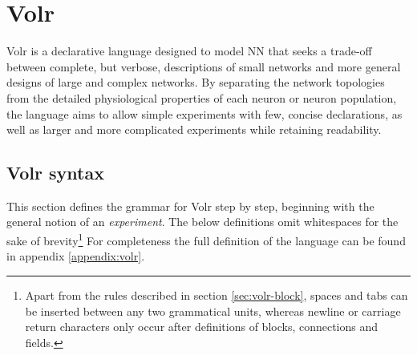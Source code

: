 \section{Volr}
Volr is a declarative language designed to model \gls{NN} that seeks a
trade-off between complete, but verbose, descriptions of small
networks and more general designs of large and complex networks.
By separating the network topologies from the detailed physiological properties
of each neuron or neuron population, the language aims to allow simple
experiments with few, concise declarations, as well as larger and more
complicated experiments while retaining readability.

\subsection{Volr syntax}
This section defines the grammar for Volr step by step, beginning
with the general notion of an \textit{experiment}.
The below definitions omit whitespaces for the sake of brevity\footnote{
Apart from the rules described in section \ref{sec:volr-block}, spaces and
tabs can be inserted between any two grammatical units, whereas newline
or carriage return characters only occur after definitions of blocks,
connections and fields.
}
For completeness the full definition of the language can be found in appendix
\ref{appendix:volr}.

